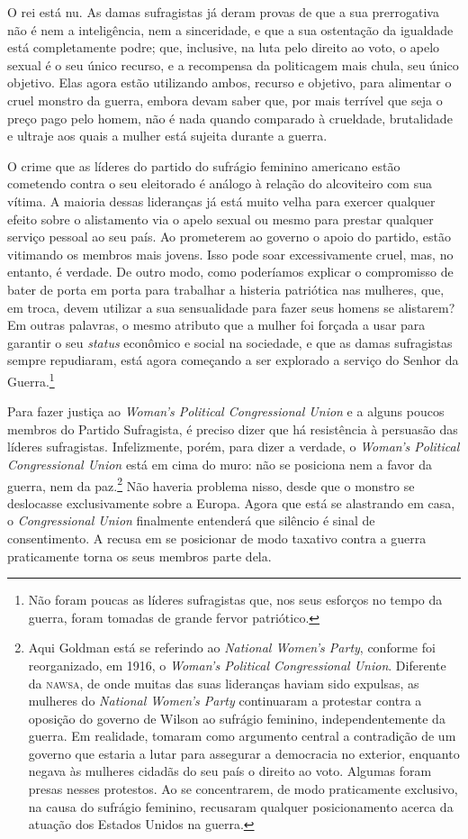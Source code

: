 O rei está nu. As damas sufragistas já deram provas de que a sua
prerrogativa não é nem a inteligência, nem a sinceridade, e que a sua
ostentação da igualdade está completamente podre; que, inclusive, na
luta pelo direito ao voto, o apelo sexual é o seu único recurso, e a
recompensa da politicagem mais chula, seu único objetivo. Elas agora
estão utilizando ambos, recurso e objetivo, para alimentar o cruel
monstro da guerra, embora devam saber que, por mais terrível que seja o
preço pago pelo homem, não é nada quando comparado à crueldade,
brutalidade e ultraje aos quais a mulher está sujeita durante a guerra.

O crime que as líderes do partido do sufrágio feminino americano estão
cometendo contra o seu eleitorado é análogo à relação do alcoviteiro com
sua vítima. A maioria dessas lideranças já está muito velha para exercer
qualquer efeito sobre o alistamento via o apelo sexual ou mesmo para
prestar qualquer serviço pessoal ao seu país. Ao prometerem ao governo o
apoio do partido, estão vitimando os membros mais jovens. Isso pode soar
excessivamente cruel, mas, no entanto, é verdade. De outro modo, como
poderíamos explicar o compromisso de bater de porta em porta para
trabalhar a histeria patriótica nas mulheres, que, em troca, devem
utilizar a sua sensualidade para fazer seus homens se alistarem? Em
outras palavras, o mesmo atributo que a mulher foi forçada a usar para
garantir o seu \emph{status} econômico e social na sociedade, e que as
damas sufragistas sempre repudiaram, está agora começando a ser
explorado a serviço do Senhor da Guerra.\footnote{Não foram poucas as
  líderes sufragistas que, nos seus esforços no tempo da guerra, foram
  tomadas de grande fervor patriótico.}

Para fazer justiça ao \emph{Woman's Political Congressional Union} e a
alguns poucos membros do Partido Sufragista, é preciso dizer que há
resistência à persuasão das líderes sufragistas. Infelizmente, porém,
para dizer a verdade, o \emph{Woman's Political Congressional Union}
está em cima do muro: não se posiciona nem a favor da guerra, nem da
paz.\footnote{Aqui Goldman está se referindo ao \emph{National Women's
  Party}, conforme foi reorganizado, em 1916, o \emph{Woman's Political
  Congressional Union}. Diferente da \textsc{nawsa}, de onde muitas das suas
  lideranças haviam sido expulsas, as mulheres do \emph{National Women's
  Party} continuaram a protestar contra a oposição do governo de Wilson
  ao sufrágio feminino, independentemente da guerra. Em realidade,
  tomaram como argumento central a contradição de um governo que estaria
  a lutar para assegurar a democracia no exterior, enquanto negava às
  mulheres cidadãs do seu país o direito ao voto. Algumas foram presas
  nesses protestos. Ao se concentrarem, de modo praticamente exclusivo,
  na causa do sufrágio feminino, recusaram qualquer posicionamento
  acerca da atuação dos Estados Unidos na guerra.} Não haveria problema
nisso, desde que o monstro se deslocasse exclusivamente sobre a
Europa. Agora que está se alastrando em casa, o \emph{Congressional
Union} finalmente entenderá que silêncio é sinal de consentimento. A recusa em se
posicionar de modo taxativo contra a guerra praticamente torna os seus
membros parte dela.

